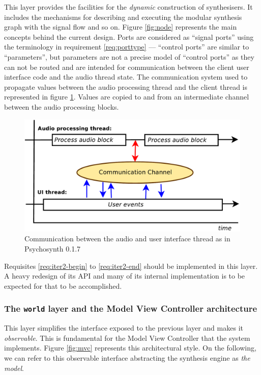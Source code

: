 This layer provides the facilities for the \emph{dynamic} construction
of synthesisers. It includes the mechanisms for describing and
executing the modular synthesis graph with the signal flow and so
on. Figure \ref{fig:node} represents the main concepts behind the
current design. Ports are considered as ``signal ports'' using the
terminology in requirement \ref{req:porttype} --- ``control ports''
are similar to ``parameters'', but parameters are not a precise model
of ``control ports'' as they can not be routed and are intended for
communication between the client user interface code and the audio
thread state. The communication system used to propagate values
between the audio processing thread and the client thread is
represented in figure \ref{fig:thread}. Values are copied to and from
an intermediate channel between the audio processing blocks.


\begin{figure}[h]
\centering
\includegraphics[width=.8\textwidth]{pic/thread.pdf}
\caption{Communication between the audio and user interface thread as
  in Psychosynth 0.1.7}
\label{fig:thread}
\end{figure}

Requisites \ref{req:iter2-begin} to \ref{req:iter2-end} should be
implemented in this layer. A heavy redesign of its API and many of its
internal implementation is to be expected for that to be
accomplished.

\subsubsection{The \texttt{world} layer and the Model View Controller
  architecture}

This layer simplifies the interface exposed to the previous layer and
makes it \emph{observable}. This is
fundamental for the Model View Controller that the system implements.
Figure \ref{fig:mvc} represents this architectural style. On the
following, we can refer to this observable interface abstracting the
synthesis engine as \emph{the model}.

